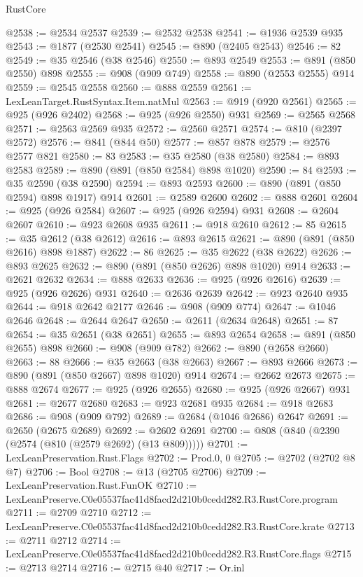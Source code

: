 \begin{lexlean}{RustCore}
\begin{coremodule}
@2538 := @2534 @2537
@2539 := @2532 @2538
@2541 := @1936 @2539 @935
@2543 := @1877 (@2530 @2541)
@2545 := @890 (@2405 @2543)
@2546 := 82
@2549 := @35 @2546 (@38 @2546)
@2550 := @893 @2549
@2553 := @891 (@850 @2550) @898
@2555 := @908 (@909 @749)
@2558 := @890 (@2553 @2555) @914
@2559 := @2545 @2558
@2560 := @888 @2559
@2561 := LexLeanTarget.RustSyntax.Item.natMul
@2563 := @919 (@920 @2561)
@2565 := @925 (@926 @2402)
@2568 := @925 (@926 @2550) @931
@2569 := @2565 @2568
@2571 := @2563 @2569 @935
@2572 := @2560 @2571
@2574 := @810 (@2397 @2572)
@2576 := @841 (@844 @50)
@2577 := @857 @878
@2579 := @2576 @2577 @821
@2580 := 83
@2583 := @35 @2580 (@38 @2580)
@2584 := @893 @2583
@2589 := @890 (@891 (@850 @2584) @898 @1020)
@2590 := 84
@2593 := @35 @2590 (@38 @2590)
@2594 := @893 @2593
@2600 := @890 (@891 (@850 @2594) @898 @1917) @914
@2601 := @2589 @2600
@2602 := @888 @2601
@2604 := @925 (@926 @2584)
@2607 := @925 (@926 @2594) @931
@2608 := @2604 @2607
@2610 := @923 @2608 @935
@2611 := @918 @2610
@2612 := 85
@2615 := @35 @2612 (@38 @2612)
@2616 := @893 @2615
@2621 := @890 (@891 (@850 @2616) @898 @1887)
@2622 := 86
@2625 := @35 @2622 (@38 @2622)
@2626 := @893 @2625
@2632 := @890 (@891 (@850 @2626) @898 @1020) @914
@2633 := @2621 @2632
@2634 := @888 @2633
@2636 := @925 (@926 @2616)
@2639 := @925 (@926 @2626) @931
@2640 := @2636 @2639
@2642 := @923 @2640 @935
@2644 := @918 @2642 @2177
@2646 := @908 (@909 @774)
@2647 := @1046 @2646
@2648 := @2644 @2647
@2650 := @2611 (@2634 @2648)
@2651 := 87
@2654 := @35 @2651 (@38 @2651)
@2655 := @893 @2654
@2658 := @891 (@850 @2655) @898
@2660 := @908 (@909 @782)
@2662 := @890 (@2658 @2660)
@2663 := 88
@2666 := @35 @2663 (@38 @2663)
@2667 := @893 @2666
@2673 := @890 (@891 (@850 @2667) @898 @1020) @914
@2674 := @2662 @2673
@2675 := @888 @2674
@2677 := @925 (@926 @2655)
@2680 := @925 (@926 @2667) @931
@2681 := @2677 @2680
@2683 := @923 @2681 @935
@2684 := @918 @2683
@2686 := @908 (@909 @792)
@2689 := @2684 (@1046 @2686) @2647
@2691 := @2650 (@2675 @2689)
@2692 := @2602 @2691
@2700 := @808 (@840 (@2390 (@2574 (@810 (@2579 @2692) (@13 @809)))))
@2701 := LexLeanPreservation.Rust.Flags
@2702 := Prod.{0, 0}
@2705 := @2702 (@2702 @8 @7)
@2706 := Bool
@2708 := @13 (@2705 @2706)
@2709 := LexLeanPreservation.Rust.FunOK
@2710 := LexLeanPreserve.C0e05537fac41d8facd2d210b0cedd282.R3.RustCore.program
@2711 := @2709 @2710
@2712 := LexLeanPreserve.C0e05537fac41d8facd2d210b0cedd282.R3.RustCore.krate
@2713 := @2711 @2712
@2714 := LexLeanPreserve.C0e05537fac41d8facd2d210b0cedd282.R3.RustCore.flags
@2715 := @2713 @2714
@2716 := @2715 @40
@2717 := Or.inl

\end{coremodule}
\end{lexlean}
